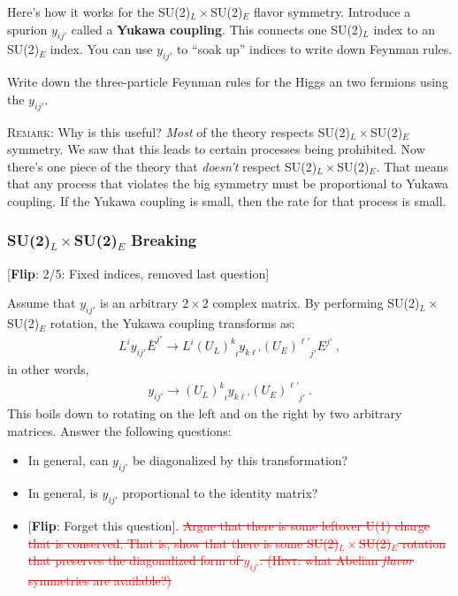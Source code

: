 \documentclass[12pt]{article}
\newcommand{\flip}[1]{{\color{red} [\textbf{Flip}: {#1}]}}
\begin{document}
Here's how it works for the SU(2)$_L\times$SU(2)$_E$ flavor symmetry. Introduce a spurion $y_{ij'}$ called a \textbf{Yukawa coupling}. This connects one SU(2)$_L$ index to an SU(2)$_E$ index. You can use $y_{ij'}$ to ``soak up'' indices to write down Feynman rules.

Write down the three-particle Feynman rules for the Higgs an two fermions using the $y_{ij'}$. 

\textsc{Remark}: Why is this useful? \emph{Most} of the theory respects SU(2)$_L\times$SU(2)$_E$ symmetry. We saw that this leads to certain processes being prohibited. Now there's one piece of the theory that \emph{doesn't} respect SU(2)$_L\times$SU(2)$_E$. That means that any process that violates the big symmetry must be proportional to Yukawa coupling. If the Yukawa coupling is small, then the rate for that process is small. 


\subsubsection{SU(2)$_L\times$SU(2)$_E$ Breaking}

\flip{2/5: Fixed indices, removed last question}

Assume that $y_{ij'}$ is an arbitrary $2\times 2$ complex matrix. By performing SU(2)$_L\times$SU(2)$_E$ rotation, the Yukawa coupling transforms as:
\begin{align}
	L^i y_{ij'}\bar E^{j'} 
	\to 
	L^i (U_L)^k_{\phantom k i} y_{k\ell'} (U_E)^{\ell'}_{\phantom{\ell'} j'} E^{j'} \ ,
\end{align}
in other words, 
\begin{align}
	y_{ij'} \to (U_L)^k_{\phantom k i} y_{k\ell'} (U_E)^{\ell'}_{\phantom{\ell'} j'} \ .
\end{align}
This boils down to rotating on the left and on the right by two arbitrary matrices. Answer the following questions:
\begin{itemize}
	\item In general, can $y_{ij'}$ be diagonalized by this transformation?
	\item In general, is $y_{ij'}$ proportional to the identity matrix?
	\item \flip{Forget this question}. \textcolor{red}{\sout{Argue that there is some leftover U(1) charge that is conserved. That is, show that there is some SU(2)$_L\times$SU(2)$_E$ rotation that preserves the diagonalized form of $y_{ij'}$. (\textsc{Hint}: what Abelian \emph{flavor} symmetries are available?)}}
\end{itemize}
\end{document}
